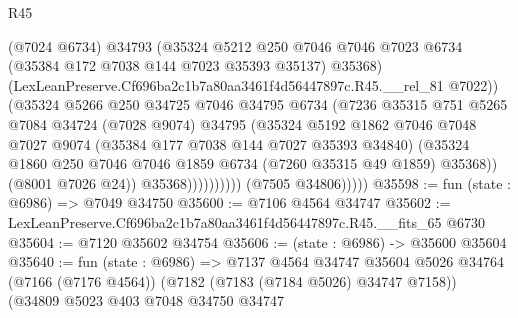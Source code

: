 \begin{lexlean}{R45}
\begin{coremodule}
{                                (@7024 @6734)
                                @34793
                                (@35324
                                  @5212
                                  @250
                                  @7046
                                  @7046
                                  @7023
                                  @6734
                                  (@35384 @172 @7038 @144 @7023 @35393 @35137)
                                  @35368)
                                (LexLeanPreserve.Cf696ba2c1b7a80aa3461f4d56447897c.R45.__rel_81
                                  @7022))
                              (@35324
                                @5266
                                @250
                                @34725
                                @7046
                                @34795
                                @6734
                                (@7236
                                  @35315
                                  @751
                                  @5265
                                  @7084
                                  @34724
                                  (@7028 @9074)
                                  @34795
                                  (@35324
                                    @5192
                                    @1862
                                    @7046
                                    @7048
                                    @7027
                                    @9074
                                    (@35384 @177 @7038 @144 @7027 @35393 @34840)
                                    (@35324
                                      @1860
                                      @250
                                      @7046
                                      @7046
                                      @1859
                                      @6734
                                      (@7260 @35315 @49 @1859)
                                      @35368))
                                  (@8001 @7026 @24))
                                @35368))))))))))
            (@7505 @34806)))))
@35598 := fun (state : @6986) => @7049 @34750
@35600 := @7106 @4564 @34747
@35602 := LexLeanPreserve.Cf696ba2c1b7a80aa3461f4d56447897c.R45.__fits_65 @6730
@35604 := @7120 @35602 @34754
@35606 := (state : @6986) -> @35600 @35604
@35640 := fun (state : @6986) =>
  @7137
    @4564
    @34747
    @35604
    @5026
    @34764
    (@7166 (@7176 @4564))
    (@7182 (@7183 (@7184 @5026) @34747 @7158))
    (@34809
      @5023
      @403
      @7048
      @34750
      @34747
}
\end{coremodule}
\end{lexlean}
